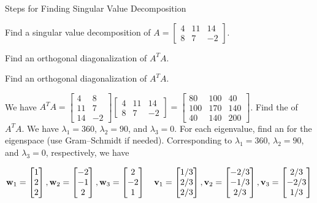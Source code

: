 \documentclass[xcolor=dvipsnames,aspectratio=169,t]{beamer}
\begin{document}
\begin{frame}{Steps for Finding Singular Value Decomposition}
  \begin{example}
  Find a singular value decomposition of 
  $A = \begin{bmatrix} 4 & 11 & 14 \\ 8 & 7 & -2 \end{bmatrix}$.
  \end{example}

  \bb
  \ii \alert{Find an orthogonal diagonalization of $A^TA$.}
  \ee
\end{frame}


\begin{frame}

  \bb
  \ii \alert{Find an orthogonal diagonalization of $A^TA$.}
  \ee

  \bi
  \ii We have $A^TA = \begin{bmatrix} 4 & 8 \\ 11 & 7 \\ 14 & -2 \end{bmatrix} \begin{bmatrix} 4 & 11 & 14 \\ 8 & 7 & -2 \end{bmatrix} = \begin{bmatrix} 80 & 100 & 40 \\ 100 & 170 & 140 \\ 40 & 140 & 200 \end{bmatrix}$.
  \ii Find the  of $A^TA$. We have $\lambda_1 = 360$, $\lambda_2 = 90$, and $\lambda_3 =0$.
  \pause
  \ii For each eigenvalue, find an  for the eigenspace (use Gram--Schmidt if needed).
  Corresponding to $\lambda_1 = 360$, $\lambda_2 = 90$, and $\lambda_3 =0$, respectively, we have

  \vspace{-0.1in}

  \[ \mathbf{w}_1 = \begin{bmatrix} 1 \\ 2 \\ 2 \end{bmatrix}, \mathbf{w}_2 = \begin{bmatrix} -2 \\ -1 \\ 2 \end{bmatrix}, \mathbf{w}_3 =  \begin{bmatrix} 2 \\ -2 \\ 1 \end{bmatrix} \quad \mathbf{v}_1 = \begin{bmatrix} 1/3 \\ 2/3 \\ 2/3 \end{bmatrix}, \mathbf{v}_2 = \begin{bmatrix} -2/3 \\ -1/3 \\ 2/3 \end{bmatrix}, \mathbf{v}_3 =  \begin{bmatrix} 2/3 \\ -2/3 \\ 1/3 \end{bmatrix} \]


\end{frame}
\end{document}
